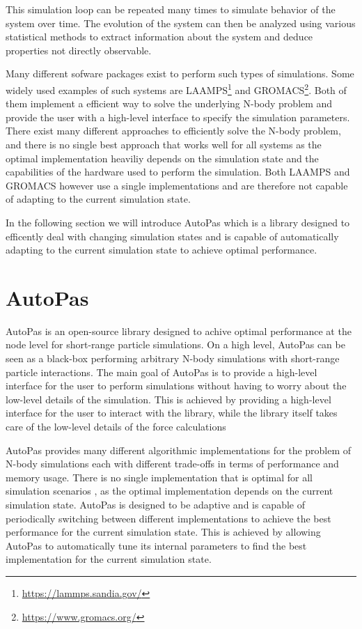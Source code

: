 
This simulation loop can be repeated many times to simulate behavior of the system over time. The evolution of the system can then be analyzed using various statistical methods to extract information about the system and deduce properties not directly observable.

Many different sofware packages exist to perform such types of simulations. Some widely used examples of such systems are LAAMPS\footnote{\url{https://lammps.sandia.gov/}} and GROMACS\footnote{\url{https://www.gromacs.org/}}. Both of them implement a efficient way to solve the underlying N-body problem and provide the user with a high-level interface to specify the simulation parameters. 
There exist many different approaches to efficiently solve the N-body problem, and there is no single best approach that works well for all systems as the optimal implementation heaviliy depends on the simulation state and the capabilities of the hardware used to perform the simulation. Both LAAMPS and GROMACS however use a single implementations and are therefore not capable of adapting to the current simulation state.

In the following section we will introduce AutoPas which is a library designed to efficently deal with changing simulation states and is capable of automatically adapting to the current simulation state to achieve optimal performance.


\section{AutoPas}



AutoPas is an open-source library designed to achive optimal performance at the node level for short-range particle simulations. On a high level, AutoPas can be seen as a black-box performing arbitrary N-body simulations with short-range particle interactions. The main goal of AutoPas is to provide a high-level interface for the user to perform simulations without having to worry about the low-level details of the simulation. This is achieved by providing a high-level interface for the user to interact with the library, while the library itself takes care of the low-level details of the force calculations

AutoPas provides many different algorithmic implementations for the problem of N-body simulations each with different trade-offs in terms of performance and memory usage. There is no single implementation that is optimal for all simulation scenarios , as the optimal implementation depends on the current simulation state.
AutoPas is designed to be adaptive and is capable of periodically switching between different implementations to achieve the best performance for the current simulation state. This is achieved by allowing AutoPas to automatically tune its internal parameters to find the best implementation for the current simulation state.


